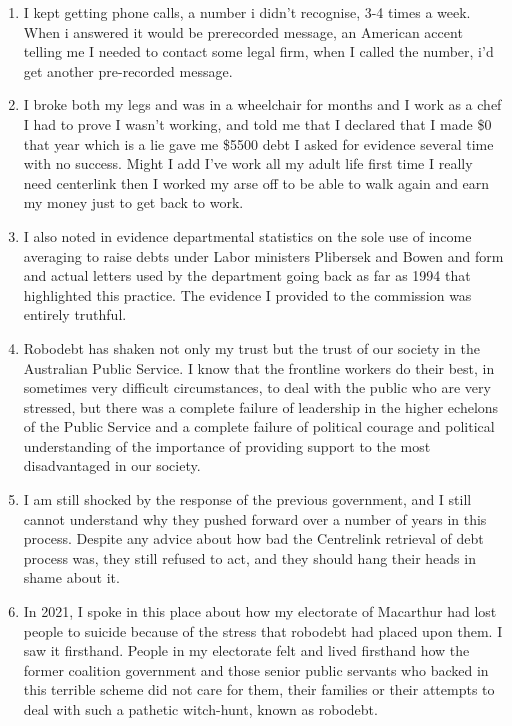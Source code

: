 \documentclass{article}
\begin{document}
\begin{enumerate}
\item I kept getting phone calls, a number i didn't recognise, 3-4 times a week. When i answered it would be prerecorded message, an American accent telling me I needed to contact some legal firm, when I called the number, i'd get another pre-recorded message.

\item I broke both my legs and was in a wheelchair for months and I work as a chef I had to prove I wasn't working, and told me that I declared that I made \$0 that year which is a lie gave me \$5500 debt I asked for evidence several time with no success. Might I add I've work all my adult life first time I really need centerlink then I worked my arse off to be able to walk again and earn my money just to get back to work.

\item I also noted in evidence departmental statistics on the sole use of income averaging to raise debts under Labor ministers Plibersek and Bowen and form and actual letters used by the department going back as far as 1994 that highlighted this practice. The evidence I provided to the commission was entirely truthful.

\item Robodebt has shaken not only my trust but the trust of our society in the Australian Public Service. I know that the frontline workers do their best, in sometimes very difficult circumstances, to deal with the public who are very stressed, but there was a complete failure of leadership in the higher echelons of the Public Service and a complete failure of political courage and political understanding of the importance of providing support to the most disadvantaged in our society. 

\item I am still shocked by the response of the previous government, and I still cannot understand why they pushed forward over a number of years in this process. Despite any advice about how bad the Centrelink retrieval of debt process was, they still refused to act, and they should hang their heads in shame about it.

\item In 2021, I spoke in this place about how my electorate of Macarthur had lost people to suicide because of the stress that robodebt had placed upon them. I saw it firsthand. People in my electorate felt and lived firsthand how the former coalition government and those senior public servants who backed in this terrible scheme did not care for them, their families or their attempts to deal with such a pathetic witch-hunt, known as robodebt.
\end{enumerate}
\end{document}
